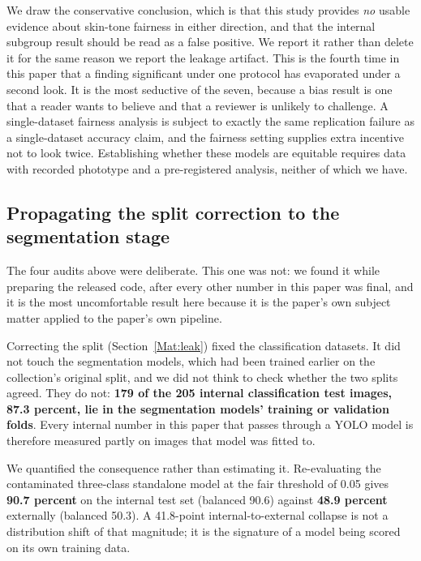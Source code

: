 \documentclass{melba}
\begin{document}
We draw the conservative conclusion, which is that this study provides \emph{no} usable evidence about skin-tone fairness in either direction, and that the internal subgroup result should be read as a false positive. We report it rather than delete it for the same reason we report the leakage artifact. This is the fourth time in this paper that a finding significant under one protocol has evaporated under a second look. It is the most seductive of the seven, because a bias result is one that a reader wants to believe and that a reviewer is unlikely to challenge. A single-dataset fairness analysis is subject to exactly the same replication failure as a single-dataset accuracy claim, and the fairness setting supplies extra incentive not to look twice. Establishing whether these models are equitable requires data with recorded phototype and a pre-registered analysis, neither of which we have.

\subsection{Propagating the split correction to the segmentation stage}
\label{Res:segleak}
The four audits above were deliberate. This one was not: we found it while preparing the released code, after every other number in this paper was final, and it is the most uncomfortable result here because it is the paper's own subject matter applied to the paper's own pipeline.

Correcting the split (Section~\ref{Mat:leak}) fixed the classification datasets. It did not touch the segmentation models, which had been trained earlier on the collection's original split, and we did not think to check whether the two splits agreed. They do not: \textbf{179 of the 205 internal classification test images, 87.3 percent, lie in the segmentation models' training or validation folds}. Every internal number in this paper that passes through a YOLO model is therefore measured partly on images that model was fitted to.

We quantified the consequence rather than estimating it. Re-evaluating the contaminated three-class standalone model at the fair threshold of 0.05 gives \textbf{90.7 percent} on the internal test set (balanced 90.6) against \textbf{48.9 percent} externally (balanced 50.3). A 41.8-point internal-to-external collapse is not a distribution shift of that magnitude; it is the signature of a model being scored on its own training data.
\end{document}

